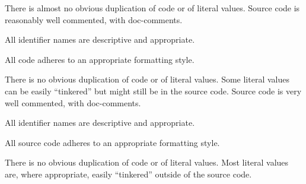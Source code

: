 \documentclass{../../fal_assignment}
\begin{document}
\begin{markingrubric}
             \par There is almost no obvious duplication of code or of literal values.   
        \grade Source code is reasonably well commented, with doc-comments.
            \par All identifier names are descriptive and appropriate.
            \par All code adheres to an appropriate formatting style.
             \par There is no obvious duplication of code or of literal values. Some literal values can be easily ``tinkered'' but might still be in the source code. 
        \grade Source code is very well commented, with doc-comments.
            \par All identifier names are descriptive and appropriate.
            \par All source code adheres to an appropriate formatting style.
             \par There is no obvious duplication of code or of literal values. Most literal values are, where appropriate, easily ``tinkered'' outside of the source code.  
%
\end{markingrubric}
\end{document}
